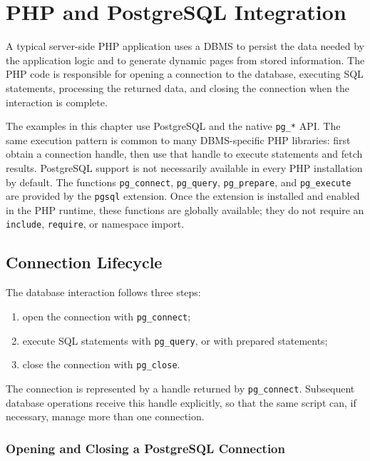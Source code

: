 \documentclass{scrbook}
\begin{document}
	\chapter{PHP and PostgreSQL Integration}
	
	A typical server-side PHP application uses a DBMS to persist the data needed by the application logic and to generate dynamic pages from stored information. The PHP code is responsible for opening a connection to the database, executing SQL statements, processing the returned data, and closing the connection when the interaction is complete.
	
	The examples in this chapter use PostgreSQL and the native \texttt{pg\_*} API. The same execution pattern is common to many DBMS-specific PHP libraries: first obtain a connection handle, then use that handle to execute statements and fetch results. PostgreSQL support is not necessarily available in every PHP installation by default. The functions \texttt{pg\_connect}, \texttt{pg\_query}, \texttt{pg\_prepare}, and \texttt{pg\_execute} are provided by the \texttt{pgsql} extension. Once the extension is installed and enabled in the PHP runtime, these functions are globally available; they do not require an \texttt{include}, \texttt{require}, or namespace import.
	
	\section{Connection Lifecycle}
	
	The database interaction follows three steps:
	
	\begin{enumerate}
		\item open the connection with \texttt{pg\_connect};
		\item execute SQL statements with \texttt{pg\_query}, or with prepared statements;
		\item close the connection with \texttt{pg\_close}.
	\end{enumerate}
	
	The connection is represented by a handle returned by \texttt{pg\_connect}. Subsequent database operations receive this handle explicitly, so that the same script can, if necessary, manage more than one connection.
	
	\subsection{Opening and Closing a PostgreSQL Connection}
	
\end{document}
